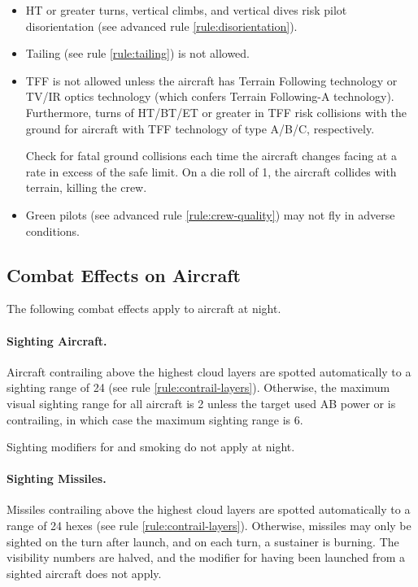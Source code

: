 \begin{advancedrules}
{\begin{itemize}
    \item{} HT or greater turns, vertical climbs, and vertical dives risk pilot disorientation (see advanced rule \ref{rule:disorientation}).

    \item{} Tailing (see rule \ref{rule:tailing}) is not allowed.

    \item{} TFF is not allowed unless the aircraft has Terrain Following technology or TV/IR optics technology (which confers Terrain Following-A technology). Furthermore, turns of HT/BT/ET or greater in TFF risk collisions with the ground for aircraft with TFF technology of type A/B/C, respectively.
    
    Check for fatal ground collisions each time the aircraft changes facing at a rate in excess of the safe limit. On a die roll of 1, the aircraft collides with terrain, killing the crew.

    \item{} Green pilots (see advanced rule \ref{rule:crew-quality}) may not fly in adverse conditions.

\end{itemize}

\subsection{Combat Effects on Aircraft}
\label{rule:aircraft-at-night}

The following combat effects apply to aircraft at night.

\paragraph{Sighting Aircraft.} Aircraft contrailing above the highest cloud layers are spotted automatically to a sighting range of 24 (see rule \ref{rule:contrail-layers}). Otherwise, the maximum visual sighting range for all aircraft is 2 unless the target used AB power or is contrailing, in which case the maximum sighting range is 6. 
    
Sighting modifiers for  and smoking do not apply at night.

\paragraph{Sighting Missiles.} Missiles contrailing above the highest cloud layers are spotted automatically to a range of 24 hexes (see rule \ref{rule:contrail-layers}). Otherwise, missiles may only be sighted on the turn after launch, and on each turn, a sustainer is burning. The visibility numbers are halved, and the modifier for having been launched from a sighted aircraft does not apply.

}
\end{advancedrules}
